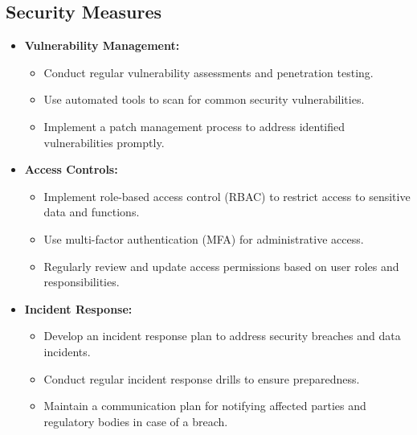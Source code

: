 \subsection{Security Measures}
\begin{itemize}[leftmargin=*]
    \item \textbf{Vulnerability Management:}
    \begin{itemize}
        \item Conduct regular vulnerability assessments and penetration testing.
        \item Use automated tools to scan for common security vulnerabilities.
        \item Implement a patch management process to address identified vulnerabilities promptly.
    \end{itemize}
    
    \item \textbf{Access Controls:}
    \begin{itemize}
        \item Implement role-based access control (RBAC) to restrict access to sensitive data and functions.
        \item Use multi-factor authentication (MFA) for administrative access.
        \item Regularly review and update access permissions based on user roles and responsibilities.
    \end{itemize}
    
    \item \textbf{Incident Response:}
    \begin{itemize}
        \item Develop an incident response plan to address security breaches and data incidents.
        \item Conduct regular incident response drills to ensure preparedness.
        \item Maintain a communication plan for notifying affected parties and regulatory bodies in case of a breach.
    \end{itemize}
\end{itemize}
